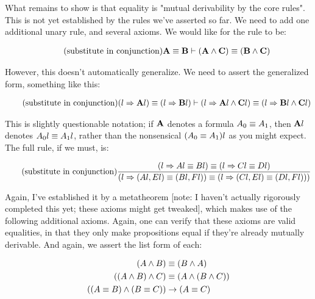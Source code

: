 \documentclass{article}
\begin{document}
  What remains to show is that equality is "mutual derivability by the core rules". This is not yet established by the rules we've asserted so far. We need to add one additional unary rule, and several axioms. We would like for the rule to be:
  
  \begin{align*}
    \tag{substitute in conjunction}\label{subst_c1}
    \mathbf{A} \equiv \mathbf{B} &\vdash (\mathbf{A} \wedge \mathbf{C}) \equiv (\mathbf{B} \wedge \mathbf{C}) \\
  \end{align*}
  
  However, this doesn't automatically generalize. We need to assert the generalized form, something like this:
  
  \begin{align*}
    \tag{substitute in conjunction}\label{subst_c}
    (l \Rightarrow \mathbf{A}l) \equiv (l \Rightarrow \mathbf{B}l) &\vdash (l \Rightarrow \mathbf{A}l \wedge \mathbf{C}l) \equiv (l \Rightarrow \mathbf{B}l \wedge \mathbf{C}l) \\
  \end{align*}
  
  This is slightly questionable notation; if $\mathbf{A}$ denotes a formula $A_0 \equiv A_1$, then $\mathbf{A}l$ denotes $A_0l \equiv A_1l$, rather than the nonsensical $(A_0 \equiv A_1)l$ as you might expect. The full rule, if we must, is:
      
  \begin{align*}
    \tag{substitute in conjunction}\label{subst_c3}
    \frac{(l \Rightarrow Al \equiv Bl) \equiv (l \Rightarrow Cl \equiv Dl)}{(l \Rightarrow (Al,El) \equiv (Bl,Fl)) \equiv (l \Rightarrow (Cl,El) \equiv (Dl,Fl)))} \\
  \end{align*}
  
  Again, I've established it by a metatheorem [note: I haven't actually rigorously completed this yet; these axioms might get tweaked], which makes use of the following additional axioms. Again, one can verify that these axioms are valid equalities, in that they only make propositions equal if they're already mutually derivable. And again, we assert the list form of each:
  
  \begin{align*}
    (A \wedge B) &\equiv (B \wedge A)\\
    ((A \wedge B) \wedge C) &\equiv (A \wedge (B \wedge C))\\
    ((A \equiv B) \wedge (B \equiv C)) &\to (A \equiv C)\\
  \end{align*}
  
\end{document}
